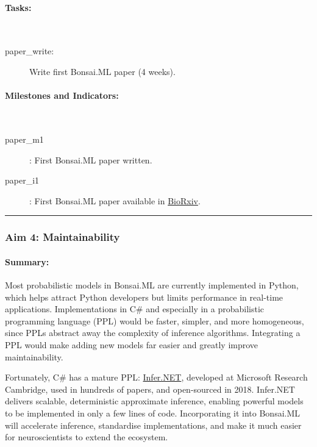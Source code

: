 \paragraph{Tasks:}\mbox{}\\

\begin{description}

    \item[paper\_write:] Write first Bonsai.ML paper (4 weeks).

\end{description}

\paragraph{Milestones and Indicators:}\mbox{}\\

\begin{description}

    \item[paper\_m1]: First Bonsai.ML paper written.
    \item[paper\_i1]: First Bonsai.ML paper available in
        \href{https://www.biorxiv.org/}{BioRxiv}.

\end{description}

\noindent\rule{\textwidth}{1pt}
\subsubsection{Aim 4: Maintainability}

\paragraph{Summary:} Most probabilistic models in Bonsai.ML are currently
implemented in Python, which helps attract Python developers but limits
performance in real-time applications. Implementations in C\# and especially in
a probabilistic programming language (PPL) would be faster, simpler, and more
homogeneous, since PPLs abstract away the complexity of inference algorithms.
Integrating a PPL would make adding new models far easier and greatly improve
maintainability.  

Fortunately, C\# has a mature PPL:
\href{https://dotnet.github.io/infer/}{Infer.NET}, developed at Microsoft
Research Cambridge, used in hundreds of papers, and open-sourced in 2018.
Infer.NET delivers scalable, deterministic approximate inference, enabling
powerful models to be implemented in only a few lines of code. Incorporating it
into Bonsai.ML will accelerate inference, standardise implementations, and make
it much easier for neuroscientists to extend the ecosystem.  

